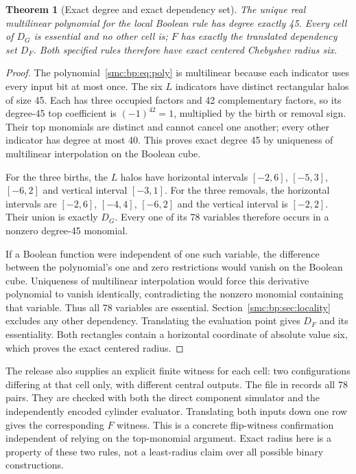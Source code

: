 \documentclass[11pt,letterpaper]{article}
\numberwithin{equation}{section}
\newtheorem{theorem}{Theorem}[section]
\theoremstyle{definition}
\theoremstyle{remark}
\newcommand{\file}[1]{\texttt{\detokenize{#1}}}
\begin{document}
\begin{theorem}[Exact degree and exact dependency set]\label{smc:bp:thm:degree}
The unique real multilinear polynomial for the local Boolean rule has degree exactly 45. Every cell of $D_G$ is essential and no other cell is; $F$ has exactly the translated dependency set $D_F$. Both specified rules therefore have exact centered Chebyshev radius six.
\end{theorem}
\begin{proof}
The polynomial~\eqref{smc:bp:eq:poly} is multilinear because each indicator uses every input bit at most once. The six $L$ indicators have distinct rectangular halos of size 45. Each has three occupied factors and 42 complementary factors, so its degree-45 top coefficient is $(-1)^{42}=1$, multiplied by the birth or removal sign. Their top monomials are distinct and cannot cancel one another; every other indicator has degree at most 40. This proves exact degree 45 by uniqueness of multilinear interpolation on the Boolean cube.

For the three births, the $L$ halos have horizontal intervals $[-2,6]$, $[-5,3]$, $[-6,2]$ and vertical interval $[-3,1]$. For the three removals, the horizontal intervals are $[-2,6]$, $[-4,4]$, $[-6,2]$ and the vertical interval is $[-2,2]$. Their union is exactly $D_G$. Every one of its 78 variables therefore occurs in a nonzero degree-45 monomial.

If a Boolean function were independent of one such variable, the difference between the polynomial's one and zero restrictions would vanish on the Boolean cube. Uniqueness of multilinear interpolation would force this derivative polynomial to vanish identically, contradicting the nonzero monomial containing that variable. Thus all 78 variables are essential. Section~\ref{smc:bp:sec:locality} excludes any other dependency. Translating the evaluation point gives $D_F$ and its essentiality. Both rectangles contain a horizontal coordinate of absolute value six, which proves the exact centered radius.
\end{proof}

The release also supplies an explicit finite witness for each cell: two configurations differing at that cell only, with different central outputs. The file \file{essential-input-witnesses.json} in \file{scientific/audit/} records all 78 pairs. They are checked with both the direct component simulator and the independently encoded cylinder evaluator. Translating both inputs down one row gives the corresponding $F$ witness. This is a concrete flip-witness confirmation independent of relying on the top-monomial argument. Exact radius here is a property of these two rules, not a least-radius claim over all possible binary constructions.
\end{document}
